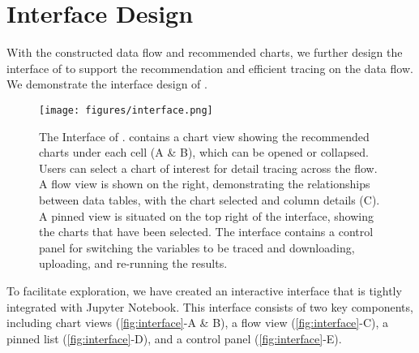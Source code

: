 \section{Interface Design}
With the constructed data flow and recommended charts, we further design the interface of \system{} to support the recommendation and efficient tracing on the data flow.
We demonstrate the interface design of \system{}.

\begin{figure*}[!htb]
    \centering
    \texttt{[image: figures/interface.png]}
    \caption{The Interface of \system{}. \system{} contains a chart view showing the recommended charts under each cell (A \& B), which can be opened or collapsed. Users can select a chart of interest for detail tracing across the flow. A flow view is shown on the right, demonstrating the relationships between data tables, with the chart selected and column details (C). A pinned view is situated on the top right of the interface, showing the charts that have been selected. The interface contains a control panel for switching the variables to be traced and downloading, uploading, and re-running the results.}
    \label{fig:interface}
\end{figure*}

To facilitate exploration, we have created an interactive interface that is tightly integrated with Jupyter Notebook. This interface consists of two key components, including chart views (\autoref{fig:interface}-A \& B), a flow view (\autoref{fig:interface}-C), a pinned list (\autoref{fig:interface}-D), and a control panel (\autoref{fig:interface}-E).

